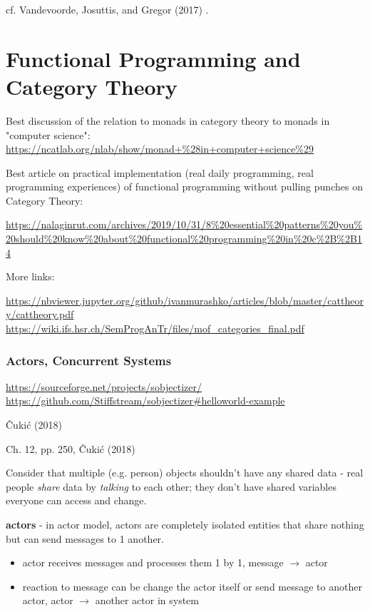 \documentclass[10pt]{amsart}
\begin{document}
cf. Vandevoorde, Josuttis, and Gregor (2017) \cite{VJG2017}. 

\part{Functional Programming and Category Theory}

Best discussion of the relation to monads in category theory to monads in "computer science": \url{https://ncatlab.org/nlab/show/monad+%28in+computer+science%29}

Best article on practical implementation (real daily programming, real programming experiences) of functional programming without pulling punches on Category Theory:

\url{https://nalaginrut.com/archives/2019/10/31/8%20essential%20patterns%20you%20should%20know%20about%20functional%20programming%20in%20c%2B%2B14}

More links:

\url{https://nbviewer.jupyter.org/github/ivanmurashko/articles/blob/master/cattheory/cattheory.pdf}
\url{https://wiki.ifs.hsr.ch/SemProgAnTr/files/mof_categories_final.pdf}

\section{Actors, Concurrent Systems}

\url{https://sourceforge.net/projects/sobjectizer/}
\url{https://github.com/Stiffstream/sobjectizer#helloworld-example}

\v{C}uki\'{c} (2018) \cite{Cuki2018}

Ch. 12, pp. 250, \v{C}uki\'{c} (2018) \cite{Cuki2018}

Consider that multiple (e.g. person) objects shouldn't have any shared data - real people \emph{share} data by \emph{talking} to each other; they don't have shared variables everyone can access and change.

\textbf{actors} - in actor model, actors are completely isolated entities that share nothing but can send messages to 1 another.
\begin{itemize}
	\item actor receives messages and processes them 1 by 1, message $\to$ actor
	\item reaction to message can be change the actor itself or send message to another actor, actor $\to $ another actor in system
\end{itemize}
\end{document}

